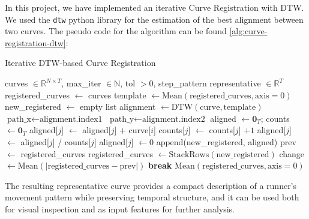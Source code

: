 In this project, we have implemented an iterative Curve Registration with DTW. We used the \texttt{dtw} python library \citet{Giorgino2009} for the estimation of the best alignment between two curves. The pseudo code for the algorithm can be found \ref{alg:curve-registration-dtw}:

\begin{algorithm}
\caption{Iterative DTW-based Curve Registration}
\begin{algorithmic}[1]
\Require curves $\in \mathbb{R}^{N \times T}$, max\_iter $\in \mathbb{N}$, tol $> 0$, step\_pattern
\Ensure representative $\in \mathbb{R}^T$
\State registered\_curves $\gets$ curves
    \State template $\gets \mathrm{Mean}(\text{registered\_curves}, \text{axis}=0)$ 
    \State new\_registered $\gets$ empty list
        \State alignment $\gets \mathrm{DTW}(\text{curve}, \text{template})$
        \State $\text{path\_x} \gets \text{alignment.index1}$ 
        \State $\text{path\_y} \gets \text{alignment.index2}$ 
        \State aligned $\gets \mathbf{0}_T$; counts $\gets \mathbf{0}_T$
            \State aligned[$j$] $\gets$ aligned[$j$] $+$ curve[$i$] 
            \State counts[$j$] $\gets$ counts[$j$] $+ 1$
        \EndFor
                \State aligned[$j$] $\gets$ aligned[$j$] / counts[$j$] 
            \Else
                \State aligned[$j$] $\gets 0$
            \EndIf
        \EndFor
        \State append(new\_registered, aligned)
    \EndFor
    \State prev $\gets$ registered\_curves
    \State registered\_curves $\gets \mathrm{StackRows}(\text{new\_registered})$ 
        \State change $\gets \mathrm{Mean}(|\text{registered\_curves} - \text{prev}|)$
            \State \textbf{break}
        \EndIf
    \EndIf
\EndFor
\State \Return $\mathrm{Mean}(\text{registered\_curves}, \text{axis}=0)$
\end{algorithmic}
\end{algorithm}

The resulting representative curve provides a compact description of a runner's movement pattern while preserving temporal structure, and it can be used both for visual inspection and as input features for further analysis.

